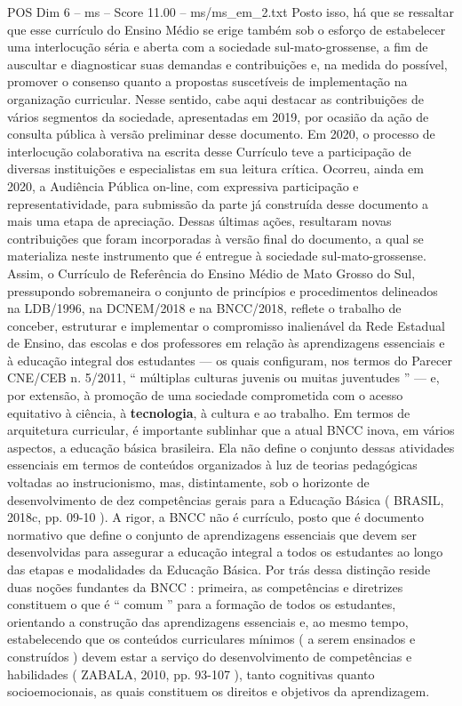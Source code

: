 \begin{textsample}{POS Dim 6 – ms – Score 11.00 – ms/ms\_em\_2.txt}
Posto isso, há que se ressaltar que esse currículo do Ensino Médio se erige também sob o esforço de estabelecer uma interlocução séria e aberta com a sociedade sul-mato-grossense, a fim de auscultar e diagnosticar suas demandas e contribuições e, na medida do possível, promover o consenso quanto a propostas suscetíveis de implementação na organização curricular.
Nesse sentido, cabe aqui destacar as contribuições de vários segmentos da sociedade, apresentadas em 2019, por ocasião da ação de consulta pública à versão preliminar desse documento.
Em 2020, o processo de interlocução colaborativa na escrita desse Currículo teve a participação de diversas instituições e especialistas em sua leitura crítica.
Ocorreu, ainda em 2020, a Audiência Pública on-line, com expressiva participação e representatividade, para submissão da parte já construída desse documento a mais uma etapa de apreciação.
Dessas últimas ações, resultaram novas contribuições que foram incorporadas à versão final do documento, a qual se materializa neste instrumento que é entregue à sociedade sul-mato-grossense.
Assim, o Currículo de Referência do Ensino Médio de Mato Grosso do Sul, pressupondo sobremaneira o conjunto de princípios e procedimentos delineados na LDB/1996, na DCNEM/2018 e na BNCC/2018, reflete o trabalho de conceber, estruturar e implementar o compromisso inalienável da Rede Estadual de Ensino, das escolas e dos professores em relação às aprendizagens essenciais e à educação integral dos estudantes — os quais configuram, nos termos do Parecer CNE/CEB n. 5/2011, “ múltiplas culturas juvenis ou muitas juventudes ” — e, por extensão, à promoção de uma sociedade comprometida com o acesso equitativo à ciência, à \textbf{tecnologia}, à cultura e ao trabalho.
Em termos de arquitetura curricular, é importante sublinhar que a atual BNCC inova, em vários aspectos, a educação básica brasileira.
Ela não define o conjunto dessas atividades essenciais em termos de conteúdos organizados à luz de teorias pedagógicas voltadas ao instrucionismo, mas, distintamente, sob o horizonte de desenvolvimento de dez competências gerais para a Educação Básica ( BRASIL, 2018c, pp. 09-10 ).
A rigor, a BNCC não é currículo, posto que é documento normativo que define o conjunto de aprendizagens essenciais que devem ser desenvolvidas para assegurar a educação integral a todos os estudantes ao longo das etapas e modalidades da Educação Básica.
Por trás dessa distinção reside duas noções fundantes da BNCC : primeira, as competências e diretrizes constituem o que é “ comum ” para a formação de todos os estudantes, orientando a construção das aprendizagens essenciais e, ao mesmo tempo, estabelecendo que os conteúdos curriculares mínimos ( a serem ensinados e construídos ) devem estar a serviço do desenvolvimento de competências e habilidades ( ZABALA, 2010, pp. 93-107 ), tanto cognitivas quanto socioemocionais, as quais constituem os direitos e objetivos da aprendizagem.

\end{textsample}
